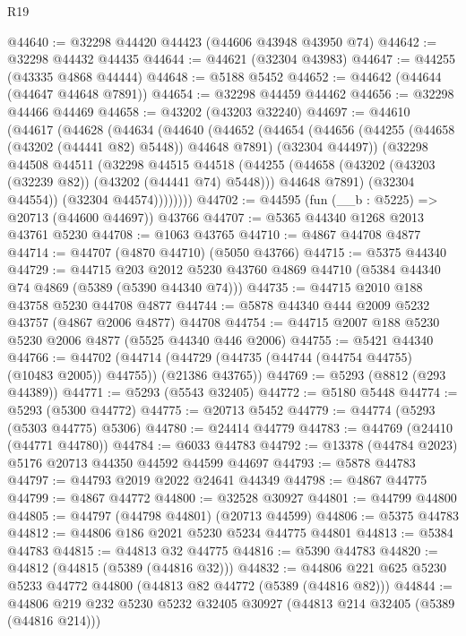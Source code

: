 \begin{lexlean}{R19}
\begin{coremodule}
@44640 := @32298 @44420 @44423 (@44606 @43948 @43950 @74)
@44642 := @32298 @44432 @44435
@44644 := @44621 (@32304 @43983)
@44647 := @44255 (@43335 @4868 @44444)
@44648 := @5188 @5452
@44652 := @44642 (@44644 (@44647 @44648 @7891))
@44654 := @32298 @44459 @44462
@44656 := @32298 @44466 @44469
@44658 := @43202 (@43203 @32240)
@44697 := @44610
    (@44617
      (@44628
        (@44634
          (@44640
            (@44652
              (@44654
                (@44656 (@44255 (@44658 (@43202 (@44441 @82) @5448)) @44648 @7891) (@32304 @44497))
                (@32298
                  @44508
                  @44511
                  (@32298
                    @44515
                    @44518
                    (@44255
                      (@44658 (@43202 (@43203 (@32239 @82)) (@43202 (@44441 @74) @5448)))
                      @44648
                      @7891)
                    (@32304 @44554))
                  (@32304 @44574))))))))
@44702 := @44595 (fun (__b : @5225) => @20713 (@44600 @44697)) @43766
@44707 := @5365 @44340 @1268 @2013 @43761 @5230
@44708 := @1063 @43765
@44710 := @4867 @44708 @4877
@44714 := @44707 (@4870 @44710) (@5050 @43766)
@44715 := @5375 @44340
@44729 := @44715
    @203
    @2012
    @5230
    @43760
    @4869
    @44710
    (@5384 @44340 @74 @4869 (@5389 (@5390 @44340 @74)))
@44735 := @44715 @2010 @188 @43758 @5230 @44708 @4877
@44744 := @5878 @44340 @444 @2009 @5232 @43757 (@4867 @2006 @4877) @44708
@44754 := @44715 @2007 @188 @5230 @5230 @2006 @4877 (@5525 @44340 @446 @2006)
@44755 := @5421 @44340
@44766 := @44702
    (@44714 (@44729 (@44735 (@44744 (@44754 @44755) (@10483 @2005)) @44755)) (@21386 @43765))
@44769 := @5293 (@8812 (@293 @44389))
@44771 := @5293 (@5543 @32405)
@44772 := @5180 @5448
@44774 := @5293 (@5300 @44772)
@44775 := @20713 @5452
@44779 := @44774 (@5293 (@5303 @44775) @5306)
@44780 := @24414 @44779
@44783 := @44769 (@24410 (@44771 @44780))
@44784 := @6033 @44783
@44792 := @13378 (@44784 @2023) @5176 @20713 @44350 @44592 @44599 @44697
@44793 := @5878 @44783
@44797 := @44793 @2019 @2022 @24641 @44349
@44798 := @4867 @44775
@44799 := @4867 @44772
@44800 := @32528 @30927
@44801 := @44799 @44800
@44805 := @44797 (@44798 @44801) (@20713 @44599)
@44806 := @5375 @44783
@44812 := @44806 @186 @2021 @5230 @5234 @44775 @44801
@44813 := @5384 @44783
@44815 := @44813 @32 @44775
@44816 := @5390 @44783
@44820 := @44812 (@44815 (@5389 (@44816 @32)))
@44832 := @44806 @221 @625 @5230 @5233 @44772 @44800 (@44813 @82 @44772 (@5389 (@44816 @82)))
@44844 := @44806 @219 @232 @5230 @5232 @32405 @30927 (@44813 @214 @32405 (@5389 (@44816 @214)))

\end{coremodule}
\end{lexlean}
